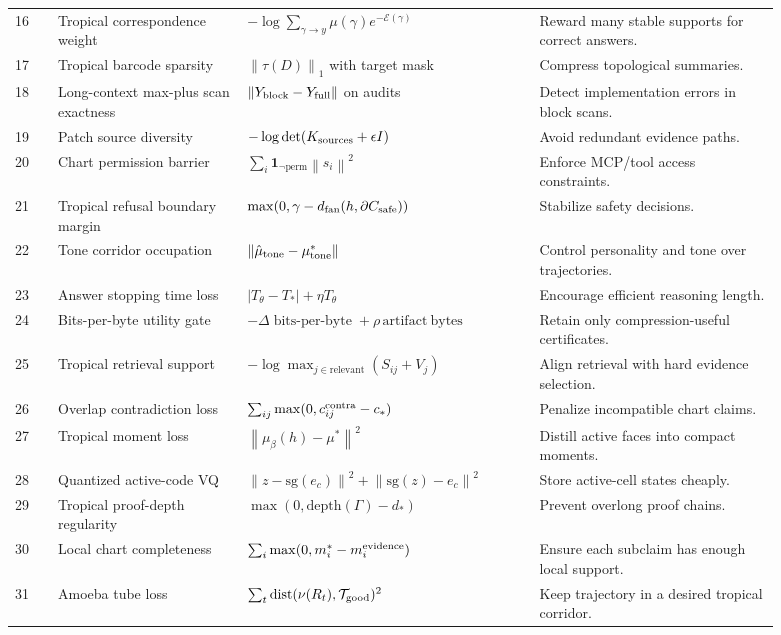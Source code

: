 \documentclass[11pt]{article}
\newcommand{\calE}{\mathcal{E}}
\newcommand{\calT}{\mathcal{T}}
\newcommand{\dist}{\operatorname{dist}}
\newcommand{\bpb}{\operatorname{bits\mbox{-}per\mbox{-}byte}}
\newcommand{\norm}[1]{\left\lVert #1\right\rVert}
\newcommand{\abs}[1]{\left\lvert #1\right\rvert}
\begin{document}
\begin{longtable}{p{0.05\linewidth}p{0.22\linewidth}p{0.34\linewidth}p{0.28\linewidth}}
16 & Tropical correspondence weight & \(-\log\sum_{\gamma\to y}\mu(\gamma)e^{-\calE(\gamma)}\) & Reward many stable supports for correct answers. \\
17 & Tropical barcode sparsity & \(\norm{\tau(D)}_1\) with target mask & Compress topological summaries. \\
18 & Long-context max-plus scan exactness & \(\norm{Y_{\rm block}-Y_{\rm full}}\) on audits & Detect implementation errors in block scans. \\
19 & Patch source diversity & \(-\log\det(K_{\rm sources}+\epsilon I)\) & Avoid redundant evidence paths. \\
20 & Chart permission barrier & \(\sum_i \mathbf 1_{\neg\mathrm{perm}}\norm{s_i}^2\) & Enforce MCP/tool access constraints. \\
21 & Tropical refusal boundary margin & \(\max(0,\gamma-d_{\rm fan}(h,\partial C_{\rm safe}))\) & Stabilize safety decisions. \\
22 & Tone corridor occupation & \(\norm{\hat\mu_{\rm tone}-\mu_{\rm tone}^*}\) & Control personality and tone over trajectories. \\
23 & Answer stopping time loss & \(\abs{T_\theta-T_*}+\eta T_\theta\) & Encourage efficient reasoning length. \\
24 & Bits-per-byte utility gate & \(-\Delta\bpb + \rho\,\mathrm{artifact\ bytes}\) & Retain only compression-useful certificates. \\
25 & Tropical retrieval support & \(-\log\max_{j\in\mathrm{relevant}}(S_{ij}+V_j)\) & Align retrieval with hard evidence selection. \\
26 & Overlap contradiction loss & \(\sum_{ij}\max(0,c_{ij}^{\rm contra}-c_*)\) & Penalize incompatible chart claims. \\
27 & Tropical moment loss & \(\norm{\mu_\beta(h)-\mu^*}^2\) & Distill active faces into compact moments. \\
28 & Quantized active-code VQ & \(\norm{z-\mathrm{sg}(e_c)}^2+\norm{\mathrm{sg}(z)-e_c}^2\) & Store active-cell states cheaply. \\
29 & Tropical proof-depth regularity & \(\max(0,\mathrm{depth}(\Gamma)-d_*)\) & Prevent overlong proof chains. \\
30 & Local chart completeness & \(\sum_i \max(0,m_i^*-m_i^{\rm evidence})\) & Ensure each subclaim has enough local support. \\
31 & Amoeba tube loss & \(\sum_t \dist(\nu(R_t),\calT_{\rm good})^2\) & Keep trajectory in a desired tropical corridor. \\

\end{longtable}
\end{document}
